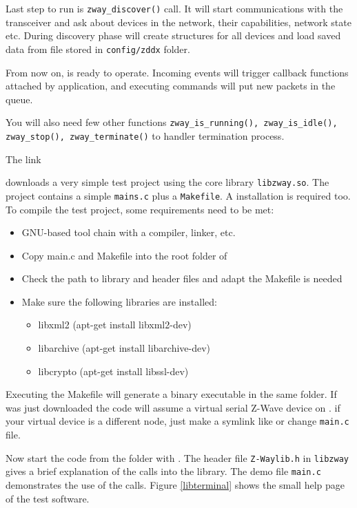 Last step to run \zway is \texttt{zway\_discover()} call. It will start communications 
with the \zwave transceiver and ask about devices in the network, their capabilities, 
network state etc. During discovery phase \zway will create structures for all devices and 
load saved data from file stored in \texttt{config/zddx} folder.

From now on, \zway is ready to operate. Incoming events will trigger callback functions 
attached by application, and executing commands will put new packets in the queue.

You will also need few other functions \texttt{zway\_is\_running(), zway\_is\_idle(), 
zway\_stop(), zway\_terminate()} to handler termination process.




The link

downloads a very simple test project using the \zway core library \texttt{libzway.so}. 
The project contains a simple \texttt{mains.c} plus a \texttt{Makefile}. A \zway installation is required 
too. To compile the test project, some requirements need to be met:
\begin {itemize}
\item GNU-based tool chain with a compiler, linker, etc.
\item Copy main.c and Makefile into the root folder of \zway
\item Check the path to library and header files and adapt the Makefile is needed
\item Make sure the following libraries are installed:
\begin {itemize}
\item libxml2 (apt-get install libxml2-dev)
\item libarchive (apt-get install libarchive-dev)
\item libcrypto (apt-get install libssl-dev)
\end {itemize}
\end {itemize}

Executing the Makefile will generate a binary executable  in the same 
folder. If \zway was just downloaded the code will assume a virtual serial Z-Wave device 
on . if your virtual device is a different node, just make a 
symlink like  or change \texttt{main.c} file.

Now start the code from the folder with . 
The header file \texttt{Z-Waylib.h} in \texttt{libzway} gives a brief explanation of the calls 
into the library. The demo file \texttt{main.c} demonstrates the use of the calls. 
Figure \ref{libterminal} shows the small help page of the test software.

